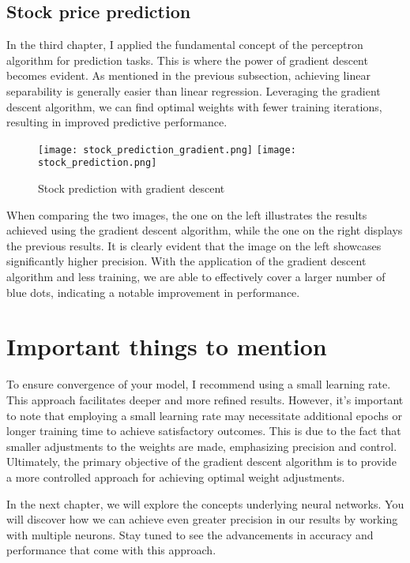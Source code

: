 \subsection{Stock price prediction}
In the third chapter, I applied the fundamental concept of the perceptron algorithm for prediction tasks.
This is where the power of gradient descent becomes evident. As mentioned in the previous subsection, achieving
linear separability is generally easier than linear regression. Leveraging the gradient descent algorithm, we
can find optimal weights with fewer training iterations, resulting in improved predictive performance.

\begin{figure}[H]
  \centering
  \texttt{[image: stock\_prediction\_gradient.png]}
  \texttt{[image: stock\_prediction.png]}
  \caption{Stock prediction with gradient descent}
\end{figure}
When comparing the two images, the one on the left illustrates the results achieved using the gradient
descent algorithm, while the one on the right displays the previous results. It is clearly evident that
the image on the left showcases significantly higher precision. With the application of the gradient descent
algorithm and less training, we are able to effectively cover a larger number of blue dots, indicating a
notable improvement in performance.

\section{Important things to mention}
To ensure convergence of your model, I recommend using a small learning rate. This approach facilitates
deeper and more refined results. However, it's important to note that employing a small learning rate may
necessitate additional epochs or longer training time to achieve satisfactory outcomes. This is due to the
fact that smaller adjustments to the weights are made, emphasizing precision and control. Ultimately, the
primary objective of the gradient descent algorithm is to provide a more controlled approach for achieving
optimal weight adjustments.

In the next chapter, we will explore the concepts underlying neural networks. You will discover how we can
achieve even greater precision in our results by working with multiple neurons. Stay tuned to see the
advancements in accuracy and performance that come with this approach.

